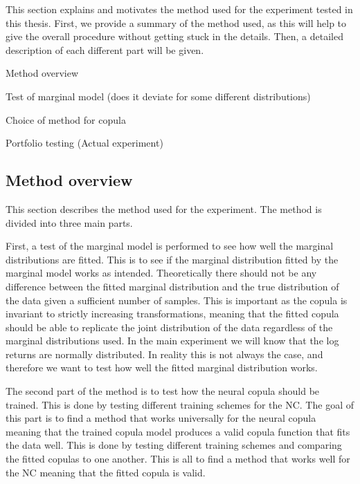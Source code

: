 This section explains and motivates the method used for the experiment tested in this thesis. First, we provide a summary of the method used, as this will help to give the overall procedure without getting stuck in the details. Then, a detailed description of each different part will be given. 


\begin{generalinstructions}
    \begin{compactenum}
        \item Method overview
        \item Test of marginal model (does it deviate for some different distributions)
        \item Choice of method for copula
        \item Portfolio testing (Actual experiment)
    \end{compactenum}
\end{generalinstructions}


\subsection{Method overview}
This section describes the method used for the experiment. The method is divided into three main parts. 

First, a test of the marginal model is performed to see how well the marginal distributions are fitted. This is to see if the marginal distribution fitted by the marginal model works as intended. Theoretically there should not be any difference between the fitted marginal distribution and the true distribution of the data  given a sufficient number of samples. This is important as the copula is invariant to strictly increasing transformations, meaning that the fitted copula should be able to replicate the joint distribution of the data regardless of the marginal distributions used. In the main experiment we will know that the log returns are normally distributed. In reality this is not always the case, and therefore we want to test how well the fitted marginal distribution works.

The second part of the method is to test how the neural copula should be trained. This is done by testing different training schemes for the \gls{NC}. The goal of this part is to find a method that works universally for the neural copula meaning that the trained copula model produces a valid copula function that fits the data well. This is done by testing different training schemes and comparing the fitted copulas to one another. This is all to find a method that works well for the \gls{NC} meaning that the fitted copula is valid. 

